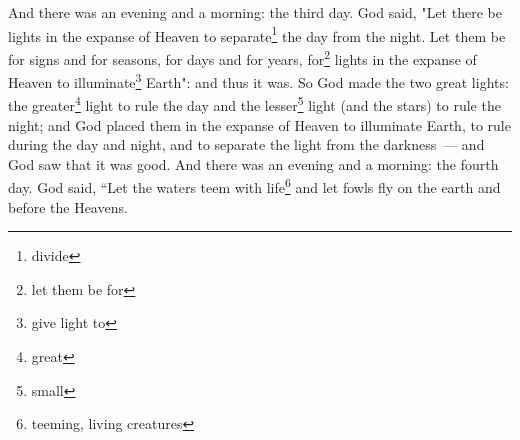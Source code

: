 \begin{enumerate}
     And there was an evening and a morning: the third day.%
     God said, "Let there be lights in the expanse of Heaven to separate\footnote{divide} the day from the night. Let them be for signs and for seasons, for days and for years,%
     for\footnote{let them be for} lights in the expanse of Heaven to illuminate\footnote{give light to} Earth": and thus it was.%
     So God made the two great lights: the greater\footnote{great} light to rule the day and the lesser\footnote{small} light (and the stars) to rule the night;%
     and God placed them in the expanse of Heaven to illuminate Earth,%
     to rule during the day and night, and to separate the light from the darkness~--- and God saw that it was good.%
     And there was an evening and a morning: the fourth day.%
     God said, ``Let the waters teem with life\footnote{teeming, living creatures} and let fowls fly on the earth and before the Heavens.%
\end{enumerate}
